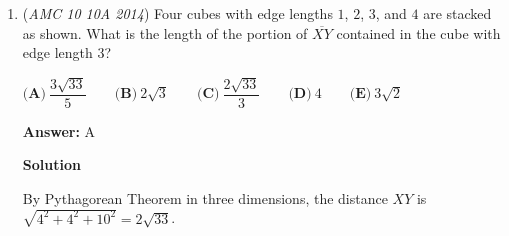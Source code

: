 \begin{enumerate}
Now we have 3 equations with 3 variables:

 $\begin{cases} x_2=x_1+x_3 \\ x_2(x_1-x_3)=15 \\ (x_3-x_1)^2-x_2^2=16 \end{cases}$

 We substitute $x_2$ into the 2 other equations:

 \begin{verbatim}
$(x_1+x_3)(x_1-x_3)=15$$x_1^2-x_3^2=15$
\end{verbatim}

\begin{verbatim}
$(x_3-x_1)^2-(x_3+x_1)^2=16$$x_3^2-2x_1x_3+x_3^2-x_1^2-2x_1x_3-x_3^2=16$$-4x_1x_3=16$$x_1x_3=-4$
\end{verbatim}

Now we have 2 equations of $x_1$ and $x_3$:

 $\begin{cases} x_1^2-x_3^2=15 \\ x_1x_3=-4 \end{cases}$
\begin{verbatim}
$x_3=- \frac{4}{x_1}$$x_1^2-(- \frac{4}{x_1})^2=15$$x_1^2- \frac{16}{x_1^2}=15$
\end{verbatim}

This is the same equation as solution $2$. So $x_1= \pm 4, AB=\sqrt{17}, [ABCD]=\boxed{\textbf{(B) }17}$




\textbf{Solution 4 (not rigorous)}

Draw it out, by inspection the coordinates are $(-1, 4)$, $(0, 0)$, $(4, 1)$, and $(3, 5)$. The side length is $\sqrt{17}, [ABCD]=\boxed{\textbf{(B) }17}$~JH. L

 


	\item (\textit{AMC 10 10A 2014}) Four cubes with edge lengths $1$, $2$, $3$, and $4$ are stacked as shown. What is the length of the portion of $\overline{XY}$ contained in the cube with edge length $3$?


 $\textbf{(A)}\ \dfrac{3\sqrt{33}}5\qquad\textbf{(B)}\ 2\sqrt3\qquad\textbf{(C)}\ \dfrac{2\sqrt{33}}3\qquad\textbf{(D)}\ 4\qquad\textbf{(E)}\ 3\sqrt2$

 \textbf{Answer: }A



\textbf{Solution}

By Pythagorean Theorem in three dimensions, the distance $XY$ is $\sqrt{4^2+4^2+10^2}=2\sqrt{33}$.


\end{enumerate}
